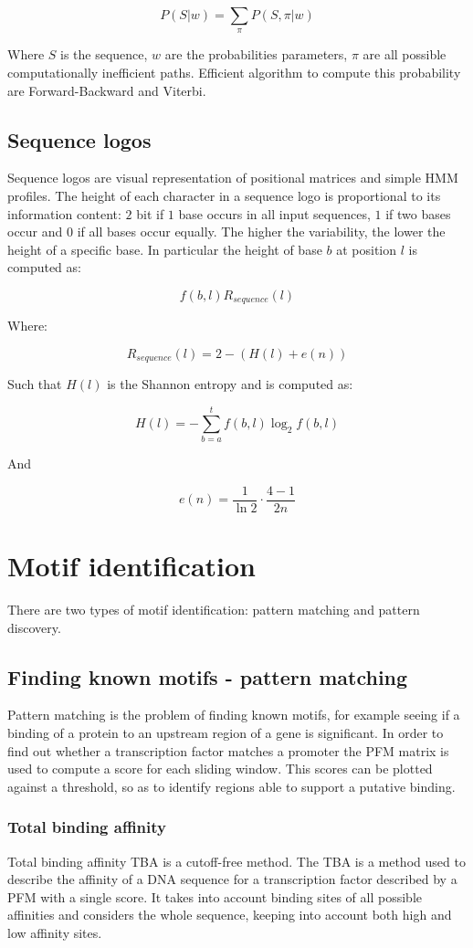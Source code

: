 		$$P(S|w) = \sum\limits_\pi P(S, \pi |w)$$

		Where $S$ is the sequence, $w$ are the probabilities parameters, $\pi$ are all possible computationally inefficient paths.
		Efficient algorithm to compute this probability are Forward-Backward and Viterbi.

	\subsection{Sequence logos}
	Sequence logos are visual representation of positional matrices and simple HMM profiles.
	The height of each character in a sequence logo is proportional to its information content: $2$ bit if $1$ base occurs in all input sequences, $1$ if two bases occur and $0$ if all bases occur equally.
	The higher the variability, the lower the height of a specific base.
	In particular the height of base $b$ at position $l$ is computed as:

	$$f(b,l)R_{sequence}(l)$$

	Where:

	$$R_{sequence}(l) = 2-(H(l) + e(n))$$

	Such that $H(l)$ is the Shannon entropy and is computed as:

	$$H(l) = -\sum\limits_{b=a}^tf(b,l)\log_2 f(b,l)$$

	And

	$$e(n) = \frac{1}{\ln 2}\cdot \frac{4-1}{2n}$$

\section{Motif identification}
There are two types of motif identification: pattern matching and pattern discovery.

	\subsection{Finding known motifs - pattern matching}
	Pattern matching is the problem of finding known motifs, for example seeing if a binding of a protein to an upstream region of a gene is significant.
	In order to find out whether a transcription factor matches a promoter the PFM matrix is used to compute a score for each sliding window.
	This scores can be plotted against a threshold, so as to identify regions able to support a putative binding.

		\subsubsection{Total binding affinity}
		Total binding affinity TBA is a cutoff-free method.
		The TBA is a method used to describe the affinity of a DNA sequence for a transcription factor described by a PFM with a single score.
		It takes into account binding sites of all possible affinities and considers the whole sequence, keeping into account both high and low affinity sites.

